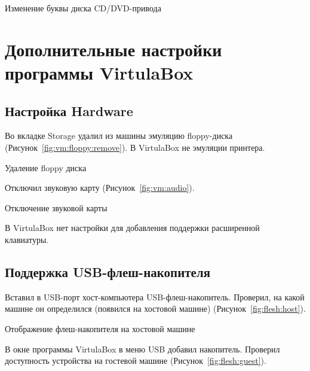 \begin{image}
	\caption{Изменение буквы диска CD/DVD-привода}
	\label{fig:setting:dvd}
\end{image}

\clearpage

\section{Дополнительные настройки программы VirtulaBox}

\subsection{Настройка Hardware}
Во вкладке Storage удалил из машины эмуляцию floppy-диска
(Рисунок~\ref{fig:vm:floppy:remove}).
В VirtulaBox не эмуляции принтера.

\begin{image}
	\caption{Удаление floppy диска}
	\label{fig:vm:floppy:remove}
\end{image}

Отключил звуковую карту (Рисунок~\ref{fig:vm:audio}).

\begin{image}
	\caption{Отключение звуковой карты}
	\label{fig:vm:audio}
\end{image}

В VirtulaBox нет настройки для добавления поддержки расширенной клавиатуры.

\clearpage

\subsection{Поддержка USB-флеш-накопителя}

Вставил в USB-порт хост-компьютера USB-флеш-накопитель.
Проверил, на какой машине он определился (появился на хостовой машине)
(Рисунок~\ref{fig:flesh:host}).

\begin{image}
	\caption{Отображение флеш-накопителя на хостовой машине}
	\label{fig:flesh:host}
\end{image}

В окне программы VirtulaBox в меню USB добавил накопитель.
Проверил доступность устройства на гостевой машине
(Рисунок~\ref{fig:flesh:guest}).

